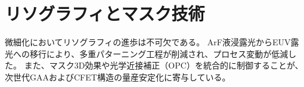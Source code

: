 \section{リソグラフィとマスク技術}
微細化においてリソグラフィの進歩は不可欠である。  
ArF液浸露光からEUV露光への移行により、多重パターニング工程が削減され、プロセス変動が低減した。  
また、マスク3D効果や光学近接補正（OPC）を統合的に制御することが、次世代GAAおよびCFET構造の量産安定化に寄与している。
